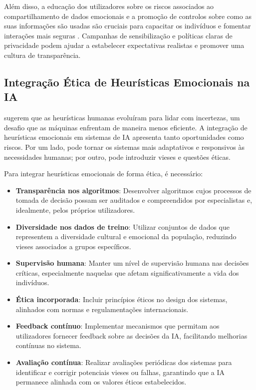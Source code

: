 \documentclass[a4paper,12pt]{report}
\begin{document}
	Além disso, a educação dos utilizadores sobre os riscos associados ao compartilhamento de dados emocionais e a promoção de controlos sobre como as suas informações são usadas são cruciais para capacitar os indivíduos e fomentar interações mais seguras \parencite{slovic2007}. Campanhas de sensibilização e políticas claras de privacidade podem ajudar a estabelecer expectativas realistas e promover uma cultura de transparência.
	
	\subsection{Integração Ética de Heurísticas Emocionais na IA}
	
	\textcite{gigerenzer2009} sugerem que as heurísticas humanas evoluíram para lidar com incertezas, um desafio que as máquinas enfrentam de maneira menos eficiente. A integração de heurísticas emocionais em sistemas de IA apresenta tanto oportunidades como riscos. Por um lado, pode tornar os sistemas mais adaptativos e responsivos às necessidades humanas; por outro, pode introduzir vieses e questões éticas.
	
	Para integrar heurísticas emocionais de forma ética, é necessário:
	
	\begin{itemize}
		\item \textbf{Transparência nos algoritmos}: Desenvolver algoritmos cujos processos de tomada de decisão possam ser auditados e compreendidos por especialistas e, idealmente, pelos próprios utilizadores.
		\item \textbf{Diversidade nos dados de treino}: Utilizar conjuntos de dados que representem a diversidade cultural e emocional da população, reduzindo vieses associados a grupos específicos.
		\item \textbf{Supervisão humana}: Manter um nível de supervisão humana nas decisões críticas, especialmente naquelas que afetam significativamente a vida dos indivíduos.
		\item \textbf{Ética incorporada}: Incluir princípios éticos no design dos sistemas, alinhados com normas e regulamentações internacionais.
		\item \textbf{Feedback contínuo}: Implementar mecanismos que permitam aos utilizadores fornecer feedback sobre as decisões da IA, facilitando melhorias contínuas no sistema.
		\item \textbf{Avaliação contínua}: Realizar avaliações periódicas dos sistemas para identificar e corrigir potenciais vieses ou falhas, garantindo que a IA permanece alinhada com os valores éticos estabelecidos.
	\end{itemize}
	
\end{document}
